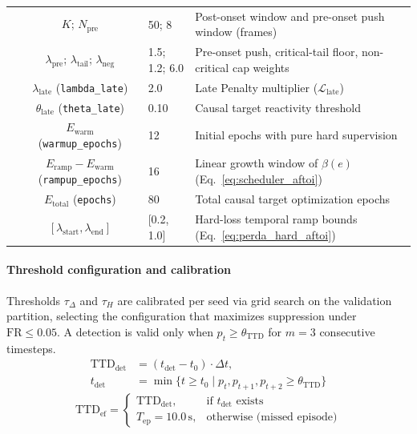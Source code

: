 \documentclass[a4paper,fleqn]{cas-dc}
\begin{document}
\begin{table}[!tbp]
\begin{tabularx}{\textwidth}{l c l X}
 & {\color{\revcolor}$K$; $N_{\text{pre}}$} & {\color{\revcolor}50; 8} & {\color{\revcolor}Post-onset window and pre-onset push window (frames)} \\
 & {\color{\revcolor}$\lambda_{\text{pre}}$; $\lambda_{\text{tail}}$; $\lambda_{\text{neg}}$} & {\color{\revcolor}1.5; 1.2; 6.0} & {\color{\revcolor}Pre-onset push, critical-tail floor, non-critical cap weights} \\
 & {\color{\revcolor}$\lambda_{\text{late}}$ (\texttt{lambda\_late})} & {\color{\revcolor}2.0} & {\color{\revcolor}Late Penalty multiplier ($\mathcal{L}_{\text{late}}$)} \\
 & {\color{\revcolor}$\theta_{\text{late}}$ (\texttt{theta\_late})}   & {\color{\revcolor}0.10} & {\color{\revcolor}Causal target reactivity threshold} \\
\midrule
{}
 & {\color{\revcolor}$E_{\text{warm}}$ (\texttt{warmup\_epochs})} & {\color{\revcolor}12} & {\color{\revcolor}Initial epochs with pure hard supervision} \\
 & {\color{\revcolor}$E_{\text{ramp}}{-}E_{\text{warm}}$ (\texttt{rampup\_epochs})}  & {\color{\revcolor}16} & {\color{\revcolor}Linear growth window of $\beta(e)$ (Eq.~\ref{eq:scheduler_aftoi})} \\
 & $E_{\text{total}}$ (\texttt{epochs})         & 80 & Total causal target optimization epochs \\
 & {\color{\revcolor}$[\lambda_{\text{start}}, \lambda_{\text{end}}]$} & {\color{\revcolor}[0.2, 1.0]} & {\color{\revcolor}Hard-loss temporal ramp bounds (Eq.~\ref{eq:perda_hard_aftoi})} \\
\bottomrule
\end{tabularx}
\end{table}
\paragraph{Threshold configuration and calibration}
Thresholds $\tau_\Delta$ and $\tau_H$ are calibrated per seed via grid search
on the validation partition, selecting the configuration that maximizes
suppression under $\mathrm{FR}\le0.05$. A detection is valid only when
$p_t \ge \theta_{\mathrm{TTD}}$ for $m=3$ consecutive timesteps.
\begin{equation}
\begin{aligned}
\mathrm{TTD}_{\mathrm{det}} &= (t_{\mathrm{det}} - t_0)\cdot\Delta t,\\
t_{\mathrm{det}} &= \min\{t \ge t_0 \mid p_t, p_{t+1}, p_{t+2} \ge
\theta_{\mathrm{TTD}}\}
\end{aligned}
\label{eq:ttd_nominal}
\end{equation}
\begin{equation}
\mathrm{TTD}_{\mathrm{ef}} =
\begin{cases}
\mathrm{TTD}_{\mathrm{det}}, & \text{if } t_{\mathrm{det}}
  \text{ exists} \\
T_{\mathrm{ep}} = 10.0\,\text{s}, & \text{otherwise (missed episode)}
\end{cases}
\label{eq:ttd_efetivo}
\end{equation}
\end{document}
